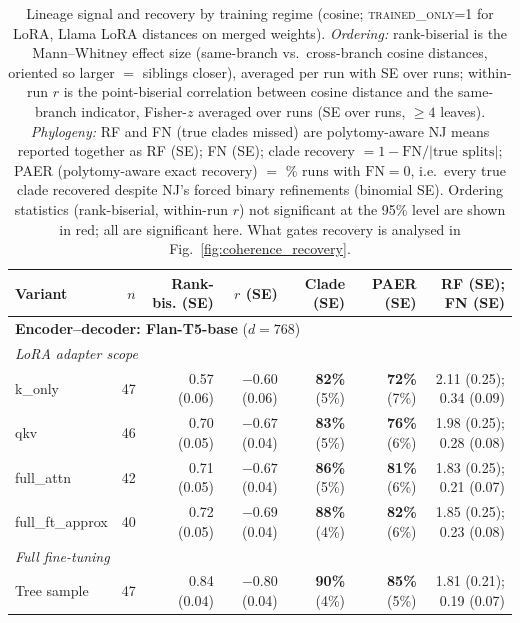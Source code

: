 \documentclass{article}
\theoremstyle{definition}
\theoremstyle{plain}
\begin{document}
\begin{table}[t]
\caption{Lineage signal and recovery by training regime (cosine; \textsc{trained\_only=1} for LoRA,
  Llama LoRA distances on merged weights). \emph{Ordering:} rank-biserial is the Mann--Whitney effect
  size (same-branch vs.\ cross-branch cosine distances, oriented so larger $=$ siblings closer),
  averaged per run with SE over runs; within-run $r$ is the point-biserial correlation between cosine
  distance and the same-branch indicator, Fisher-$z$ averaged over runs (SE over runs, $\geq 4$ leaves).
  \emph{Phylogeny:} RF and FN (true clades missed) are polytomy-aware NJ means reported together as
  RF (SE); FN (SE); clade recovery $=1-\mathrm{FN}/|\text{true splits}|$; PAER (polytomy-aware exact
  recovery) $=$ \% runs with $\mathrm{FN}=0$, i.e.\ every true clade recovered despite NJ's forced
  binary refinements (binomial SE). Ordering statistics (rank-biserial, within-run $r$) not
  significant at the 95\% level are shown in red; all are significant here. What gates recovery is
  analysed in Fig.~\ref{fig:coherence_recovery}.}
\label{tab:variants}
\begin{center}
\small
\setlength{\tabcolsep}{3pt}
\begin{tabular}{lrrrrrr}
\toprule
Variant & $n$ & Rank-bis. (SE) & $r$ (SE) & Clade (SE) & PAER (SE) & RF (SE); FN (SE) \\
\midrule
\multicolumn{7}{l}{\textbf{Encoder--decoder: Flan-T5-base} ($d=768$)} \\
\multicolumn{7}{l}{\quad\textit{LoRA adapter scope}} \\
\quad k\_only          & 47 & 0.57 (0.06) & $-0.60$ (0.06) & \textbf{82\%} (5\%) & \textbf{72\%} (7\%) & 2.11 (0.25); 0.34 (0.09) \\
\quad qkv              & 46 & 0.70 (0.05) & $-0.67$ (0.04) & \textbf{83\%} (5\%) & \textbf{76\%} (6\%) & 1.98 (0.25); 0.28 (0.08) \\
\quad full\_attn       & 42 & 0.71 (0.05) & $-0.67$ (0.04) & \textbf{86\%} (5\%) & \textbf{81\%} (6\%) & 1.83 (0.25); 0.21 (0.07) \\
\quad full\_ft\_approx & 40 & 0.72 (0.05) & $-0.69$ (0.04) & \textbf{88\%} (4\%) & \textbf{82\%} (6\%) & 1.85 (0.25); 0.23 (0.08) \\
\multicolumn{7}{l}{\quad\textit{Full fine-tuning}} \\
\quad Tree sample      & 47 & 0.84 (0.04) & $-0.80$ (0.04) & \textbf{90\%} (4\%) & \textbf{85\%} (5\%) & 1.81 (0.21); 0.19 (0.07) \\
\midrule

\end{tabular}
\end{center}
\end{table}
\end{document}
